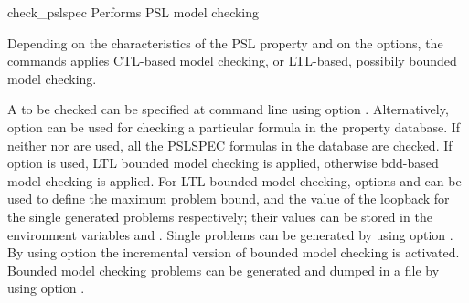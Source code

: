 \begin{nusmvCommand}{check\_pslspec} {Performs PSL model checking}


Depending on the characteristics of the PSL property and on the
options, the commands applies CTL-based model checking, or LTL-based,
possibily bounded model checking.

A \pslexpr to be checked can be specified at command line using option
. Alternatively, option  can be used for
checking a particular formula in the property database. If neither
 nor  are used, all the PSLSPEC formulas
in the database are checked. If option  is used, LTL
bounded model checking is applied, otherwise bdd-based model checking
is applied. For LTL bounded model checking, options  and
 can be used to define the maximum problem bound, and
the value of the loopback for the single generated problems
respectively; their values can be stored in the environment variables
 and . Single
problems can be generated by using option . By using
option  the incremental version of bounded model
checking is activated. Bounded model checking problems can be
generated and dumped in a file by using option .

\begin{cmdOpt}






\end{cmdOpt}
\end{nusmvCommand}
